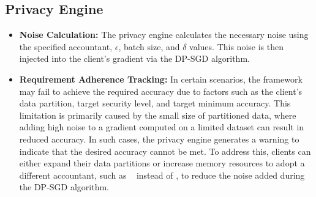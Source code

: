 \subsection{Privacy Engine}
\begin{itemize}
    \item \textbf{Noise Calculation:}
The privacy engine calculates the necessary noise using the specified accountant, \(\epsilon\), batch size, and \(\delta\) values. This noise is then injected into the client's gradient via the DP-SGD algorithm. 
\item \textbf{Requirement Adherence Tracking:}
In certain scenarios, the framework may fail to achieve the required accuracy due to factors such as the client's data partition, target security level, and target minimum accuracy. This limitation is primarily caused by the small size of partitioned data, where adding high noise to a gradient computed on a limited dataset can result in reduced accuracy. In such cases, the privacy engine generates a warning to indicate that the desired accuracy cannot be met. To address this, clients can either expand their data partitions or increase memory resources to adopt a different accountant, such as \rdp~ instead of \sys, to reduce the noise added during the DP-SGD algorithm.
\end{itemize}







